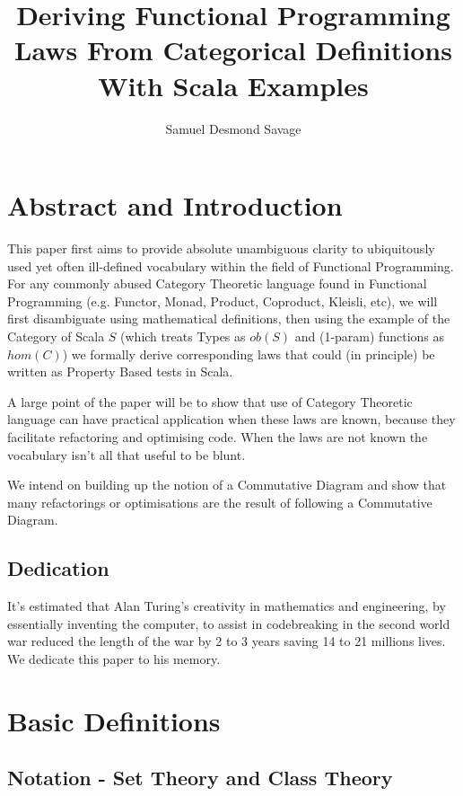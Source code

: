 \documentclass[9pt]{article} %
\title{\bf{Deriving Functional Programming Laws From Categorical Definitions With Scala Examples}}
\author{Samuel Desmond Savage}
\begin{document}
\maketitle
\tableofcontents

\newpage 

\section{Abstract and Introduction}

This paper first aims to provide absolute unambiguous clarity to ubiquitously used yet often ill-defined vocabulary within the field of Functional Programming.  For any commonly abused Category Theoretic language found in Functional Programming (e.g. Functor, Monad, Product, Coproduct, Kleisli, etc), we will first disambiguate using mathematical definitions, then using the example of the Category of Scala $S$ (which treats Types as $ob(S)$ and (1-param) functions as $hom(C)$) we formally derive corresponding laws that could (in principle) be written as Property Based tests in Scala.

A large point of the paper will be to show that use of Category Theoretic language can have practical application when these laws are known, because they facilitate refactoring and optimising code. When the laws are not known the vocabulary isn't all that useful to be blunt.

We intend on building up the notion of a Commutative Diagram and show that many refactorings or optimisations are the result of following a Commutative Diagram.

\subsection{Dedication}

It's estimated that Alan Turing's creativity in mathematics and engineering, by essentially inventing the computer, to assist in codebreaking in the second world war reduced the length of the war by 2 to 3 years saving 14 to 21 millions lives.  We dedicate this paper to his memory.

\section{Basic Definitions}

\subsection{Notation - Set Theory and Class Theory}
\end{document}
